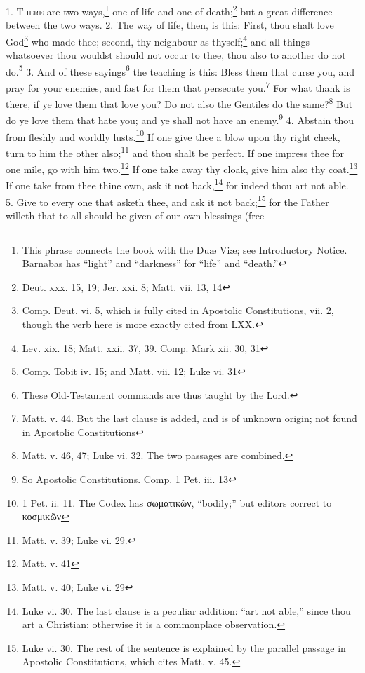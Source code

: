 

1. \textsc{There} are two ways,\footnote{\par  This phrase connects the book with the Duæ Viæ; see Introductory Notice. Barnabas has “light” and “darkness” for “life” and “death.”} one of life and one of death;\footnote{\par  Deut. xxx. 15, 19; Jer. xxi. 8; Matt. vii. 13, 14} but a great difference between the two ways. 2. The way of life, then, is this: First, thou shalt love God\footnote{\par  Comp. Deut. vi. 5, which is fully cited in Apostolic Constitutions, vii. 2, though the verb here is more exactly cited from LXX.} who made thee; second, thy neighbour as thyself;\footnote{\par  Lev. xix. 18; Matt. xxii. 37, 39. Comp. Mark xii. 30, 31} and all things whatsoever thou wouldst should not occur to thee, thou also to another do not do.\footnote{\par  Comp. Tobit iv. 15; and Matt. vii. 12; Luke vi. 31} 3. And of these sayings\footnote{\par  These Old-Testament commands are thus taught by the Lord.} the teaching is this: Bless them that curse you, and pray for your enemies, and fast for them that persecute you.\footnote{\par  Matt. v. 44. But the last clause is added, and is of unknown origin; not found in Apostolic Constitutions} For what thank is there, if ye love them that love you? Do not also the Gentiles do the same?\footnote{\par  Matt. v. 46, 47; Luke vi. 32. The two passages are combined.} But do ye love them that hate you; and ye shall not have an enemy.\footnote{\par  So Apostolic Constitutions. Comp. 1 Pet. iii. 13} 4. Abstain thou from fleshly and worldly lusts.\footnote{\par  1 Pet. ii. 11. The Codex has \textgreek{σωματικῶν}, “bodily;” but editors correct to \textgreek{κοσμικῶν}} If one give thee a blow upon thy right cheek, turn to him the other also;\footnote{\par  Matt. v. 39; Luke vi. 29.} and thou shalt be perfect. If one impress thee for one mile, go with him two.\footnote{\par  Matt. v. 41} If one take away thy cloak, give him also thy coat.\footnote{\par  Matt. v. 40; Luke vi. 29} If one take from thee thine own, ask it not back,\footnote{\par  Luke vi. 30. The last clause is a peculiar addition: “art not able,” since thou art a Christian; otherwise it is a commonplace observation.} for indeed thou art not able. 5. Give to every one that asketh thee, and ask it not back;\footnote{\par  Luke vi. 30. The rest of the sentence is explained by the parallel passage in Apostolic Constitutions, which cites Matt. v. 45.} for the Father willeth that to all should be given of our own blessings (free 